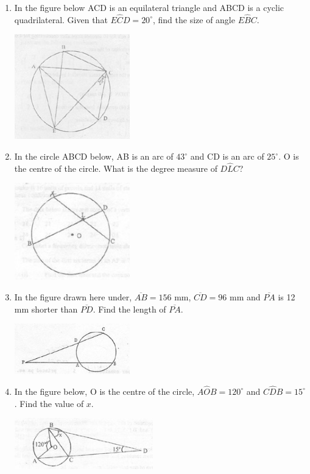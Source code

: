 \begin{enumerate}
	\item In the figure below ACD is an equilateral triangle and ABCD is a cyclic quadrilateral. Given that $E\hat{C}D = 20^\circ$, find the size of angle $E\hat{B}C$.
	\begin{center}
	\includegraphics[width=5cm]{./img/circ3.jpg}
	\end{center}

	\item In the circle ABCD below, AB is an arc of $43^\circ$ and CD is an arc of $25^\circ$. O is the centre of the circle. What is the degree measure of $D\hat{L}C$?
	\begin{center}
	\includegraphics[width=5cm]{./img/circ4.jpg}
	\end{center}

	\item In the figure drawn here under, $\overline{AB} = 156$ mm, $\overline{CD} = 96$ mm and $\overline{PA}$ is 12 mm shorter than $\overline{PD}$. Find the length of $\overline{PA}$.
	\begin{center}
	\includegraphics[width=5cm]{./img/circ5.jpg}
	\end{center}

	\item In the figure below, O is the centre of the circle, $A\hat{O}B = 120^\circ$ and $C\hat{D}B = 15^\circ$. Find the value of $x$.
	\begin{center}
	\includegraphics[width=6cm]{./img/circ6.jpg}
	\end{center}


\end{enumerate}
